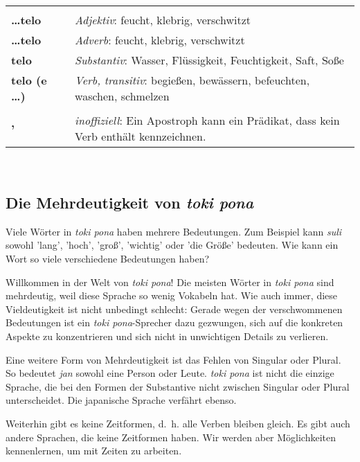 \begin{supertabular}{p{2,5cm}|ll}
 && \\ %
%
\textbf{\dots telo} && \textit{Adjektiv}: feucht, klebrig, verschwitzt \\ %
\textbf{\dots telo} && \textit{Adverb}: feucht, klebrig, verschwitzt \\ %
\textbf{telo} && \textit{Substantiv}: Wasser, Flüssigkeit, Feuchtigkeit, Saft, Soße \\ %
\textbf{telo (e \dots)} && \textit{Verb, transitiv}: begießen, bewässern, befeuchten, waschen, schmelzen \\ %
 && \\ %
%
\textbf{'} && \textit{inoffiziell}: Ein Apostroph kann ein Prädikat, dass kein Verb enthält kennzeichnen. \\ %
\end{supertabular} \\
%
\newpage
%
\subsection*{Die Mehrdeutigkeit von \textit{toki pona}}
%
%
Viele Wörter in \textit{toki pona} haben mehrere Bedeutungen. 
Zum Beispiel kann \textit{suli} sowohl 'lang', 'hoch', 'groß', 'wichtig' oder 'die Größe' bedeuten. 
Wie kann ein Wort so viele verschiedene Bedeutungen haben?

Willkommen in der Welt von \textit{toki pona}! 
Die meisten Wörter in \textit{toki pona} sind mehrdeutig, weil diese Sprache so wenig Vokabeln hat.
Wie auch immer, diese Vieldeutigkeit ist nicht unbedingt schlecht: 
Gerade wegen der verschwommenen Bedeutungen ist ein \textit{toki pona}-Sprecher dazu gezwungen, sich auf die konkreten Aspekte zu konzentrieren und sich nicht in unwichtigen Details zu verlieren.

Eine weitere Form von Mehrdeutigkeit ist das Fehlen von Singular oder Plural. 
So bedeutet \textit{jan} sowohl eine Person oder Leute. 
\textit{toki pona} ist nicht die einzige Sprache, die bei den Formen der Substantive
nicht zwischen Singular oder Plural unterscheidet. 
Die japanische Sprache verfährt ebenso. 

Weiterhin gibt es keine Zeitformen, d.~h. alle Verben bleiben gleich.
Es gibt auch andere Sprachen, die keine Zeitformen haben.
Wir werden aber Möglichkeiten kennenlernen, um mit Zeiten zu arbeiten.

